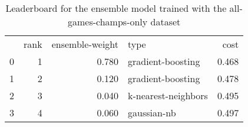 \begin{table}[]
	\centering
	\begin{tabular}{lrrlr}
		  & rank & ensemble-weight & type                & cost  \\
		0 & 1    & 0.780           & gradient-boosting   & 0.468 \\
		1 & 2    & 0.120           & gradient-boosting   & 0.478 \\
		2 & 3    & 0.040           & k-nearest-neighbors & 0.495 \\
		3 & 4    & 0.060           & gaussian-nb         & 0.497 \\
	\end{tabular}

	\caption{Leaderboard for the ensemble model trained with the all-games-champs-only dataset}
	\label{tab:lb-all-games-champs-only-autoencode}
\end{table}

